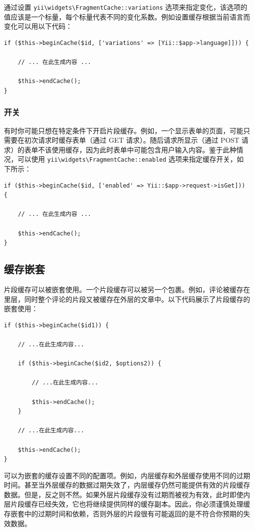 通过设置 \texttt{yii{\allowbreak{}\textbackslash}widgets{\allowbreak{}\textbackslash}FragmentCache\allowbreak{}::\allowbreak{}variations} 选项来指定变化，该选项的值应该是一个标量，每个标量代表不同的变化系数。例如设置缓存根据当前语言而变化可以用以下代码：

\lstset{language=php}\begin{lstlisting}
if ($this->beginCache($id, ['variations' => [Yii::$app->language]])) {

    // ... 在此生成内容 ...

    $this->endCache();
}
\end{lstlisting}
\subsubsection{开关 \label{caching-fragment.md::toggling-caching}}
有时你可能只想在特定条件下开启片段缓存。例如，一个显示表单的页面，可能只需要在初次请求时缓存表单（通过 GET 请求）。随后请求所显示（通过 POST 请求）的表单不该使用缓存，因为此时表单中可能包含用户输入内容。鉴于此种情况，可以使用 \texttt{yii{\allowbreak{}\textbackslash}widgets{\allowbreak{}\textbackslash}FragmentCache\allowbreak{}::\allowbreak{}enabled} 选项来指定缓存开关，如下所示：

\lstset{language=php}\begin{lstlisting}
if ($this->beginCache($id, ['enabled' => Yii::$app->request->isGet])) {

    // ... 在此生成内容 ...

    $this->endCache();
}
\end{lstlisting}
\subsection{缓存嵌套 \label{caching-fragment.md::nested-caching}}
片段缓存可以被嵌套使用。一个片段缓存可以被另一个包裹。例如，评论被缓存在里层，同时整个评论的片段又被缓存在外层的文章中。以下代码展示了片段缓存的嵌套使用：

\lstset{language=php}\begin{lstlisting}
if ($this->beginCache($id1)) {

    // ...在此生成内容...

    if ($this->beginCache($id2, $options2)) {

        // ...在此生成内容...

        $this->endCache();
    }

    // ...在此生成内容...

    $this->endCache();
}
\end{lstlisting}
可以为嵌套的缓存设置不同的配置项。例如，内层缓存和外层缓存使用不同的过期时间。甚至当外层缓存的数据过期失效了，内层缓存仍然可能提供有效的片段缓存数据。但是，反之则不然。如果外层片段缓存没有过期而被视为有效，此时即使内层片段缓存已经失效，它也将继续提供同样的缓存副本。因此，你必须谨慎处理缓存嵌套中的过期时间和依赖，否则外层的片段很有可能返回的是不符合你预期的失效数据。

